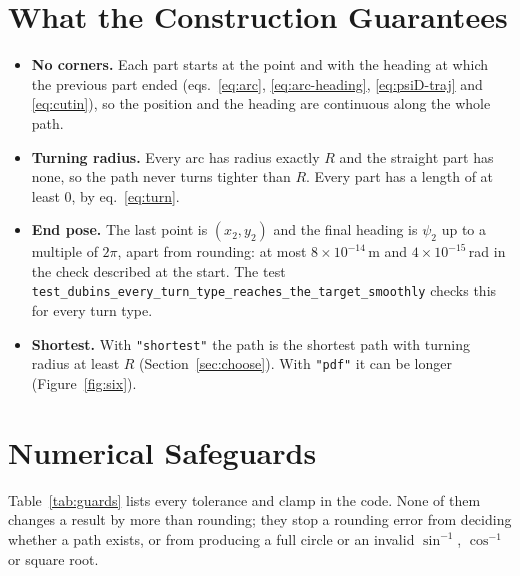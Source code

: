 \documentclass[10pt]{article}
\newcommand{\code}[1]{\texttt{#1}}
\begin{document}
\section{What the Construction Guarantees}

\begin{itemize}
  \item \textbf{No corners.} Each part starts at the point and with the heading at which the previous part ended
        (eqs.~\eqref{eq:arc}, \eqref{eq:arc-heading}, \eqref{eq:psiD-traj} and \eqref{eq:cutin}), so the position and
        the heading are continuous along the whole path.
  \item \textbf{Turning radius.} Every arc has radius exactly $R$ and the straight part has none, so the path never
        turns tighter than $R$. Every part has a length of at least 0, by eq.~\eqref{eq:turn}.
  \item \textbf{End pose.} The last point is $(x_2, y_2)$ and the final heading is $\psi_2$ up to a multiple of
        $2\pi$, apart from rounding: at most $8 \times 10^{-14}$\,m and $4 \times 10^{-15}$\,rad in the check described
        at the start. The test \code{test\_dubins\_every\_turn\_type\_reaches\_the\_target\_smoothly} checks this for
        every turn type.
  \item \textbf{Shortest.} With \code{"shortest"} the path is the shortest path with turning radius at least $R$
        (Section~\ref{sec:choose}). With \code{"pdf"} it can be longer (Figure~\ref{fig:six}).
\end{itemize}

\section{Numerical Safeguards}

Table~\ref{tab:guards} lists every tolerance and clamp in the code. None of them changes a result by more than
rounding; they stop a rounding error from deciding whether a path exists, or from producing a full circle or an
invalid $\sin^{-1}$, $\cos^{-1}$ or square root.
\end{document}
